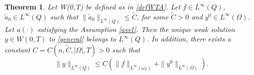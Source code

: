 \documentclass[reqno,twoside]{amsart}
\numberwithin{equation}{section}
\newtheorem{theorem}{Theorem}[section]
\theoremstyle{definition}
\numberwithin{equation}{section}
\begin{document}
\begin{theorem}\label{theorembound0}Let W(0,T) be defined as in \eqref{defWTA}.
	Let  $f\in L^\infty(Q)$, $\tilde{a}_0\in L^\infty(Q)$ such that $\|\tilde{a}_0\|_{L^\infty(Q)}\leq \tilde{C}$, for some $\tilde{C}>0$ and $y^{0}\in L^\infty(\Omega)$. Let $a(\cdot)$ satisfying the Assumption \ref{ass1}.  Then the unique weak solution $y \in W(0,T)$ to \eqref{general} belongs to $L^\infty(Q)$.
	In addition, there exists a constant $C=C(n,\tilde{C}, |\Omega|, T)>0$ such that
	\begin{equation}\label{estimationbound0}
		\|y\|_{L^\infty(Q)} \leq C\left(\|f\|_{L^\infty(\omega_T)}+\|y^0\|_{L^\infty(\Omega)}\right).
	\end{equation}
\end{theorem}
\end{document}

